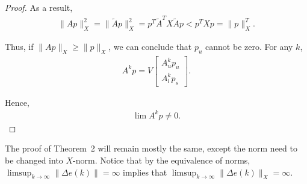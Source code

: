\documentclass{article}
\begin{document}
\begin{proof}
As a result,
\begin{align*}
  \|Ap\|_X^2 =  \|\tilde Ap\|_X^2 = p^T\tilde A^TX\tilde Ap < p^T X p = \|p\|_X^T.
\end{align*}

Thus, if $\|Ap\|_X \geq \|p\|_X$, we can conclude that $p_u$ cannot be zero. For any $k$, 
\begin{align*}
A^k p = V \begin{bmatrix}
    A_u^kp_u\\
   A_l^kp_s 
  \end{bmatrix}.
\end{align*}

Hence,
\begin{align*}
 \lim A^k p \neq 0.
\end{align*}
\end{proof}

The proof of Theorem~2 will remain mostly the same, except the norm need to be changed into $X$-norm. Notice that by the equivalence of norms, $\limsup_{k\rightarrow\infty}\|\Delta e(k)\|= \infty$ implies that $\limsup_{k\rightarrow\infty}\|\Delta e(k)\|_X= \infty$.
\end{document}
